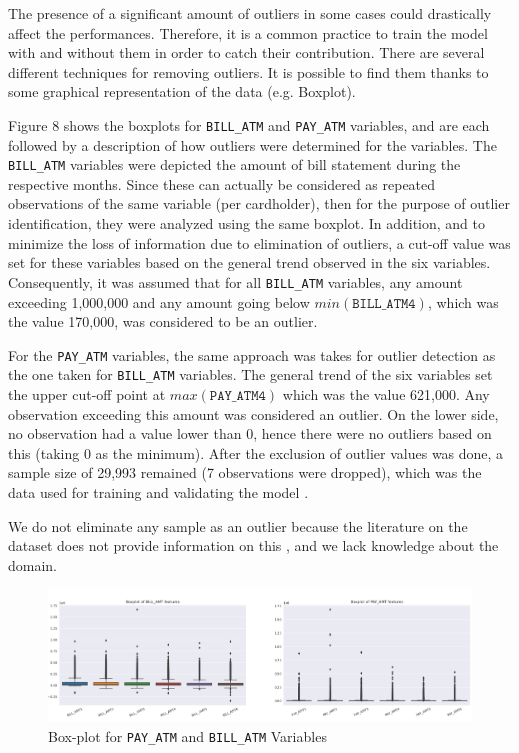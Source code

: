 \documentclass{article}
\begin{document}
The presence of a significant amount of outliers in some cases could drastically affect the performances. Therefore, it is a common practice to train the model with and without them in order to catch their contribution. 
There are several different techniques for removing outliers. It is possible to find them thanks to some graphical representation of the data (e.g. Boxplot).

Figure 8 shows the boxplots for \texttt{BILL\_ATM} and  \texttt{PAY\_ATM} variables, and are each followed by a description of how outliers were determined for the variables.
The \texttt{BILL\_ATM} variables were depicted the amount of bill statement during the respective months. Since these can actually be considered as repeated observations of the same variable (per cardholder), then for the purpose of outlier identification, they were analyzed using the same boxplot. In addition, and to minimize the loss of information due to elimination of outliers, a cut-off value was set for these variables based on the general trend observed in the six variables. Consequently, it was assumed that for all \texttt{BILL\_ATM} variables, any amount exceeding 1,000,000 and any amount going below $min(\texttt{BILL\_ATM4})$, which was the value 170,000, was considered to be an outlier.

For the \texttt{PAY\_ATM} variables, the same approach was takes for outlier detection as the one taken for \texttt{BILL\_ATM} variables. The general trend of the six variables set the upper cut-off point at $max(\texttt{PAY\_ATM4})$ which was the value 621,000. Any observation exceeding this amount was considered an outlier. On the lower side, no observation had a value lower than 0, hence there were no outliers based on this (taking 0 as the minimum).
After the exclusion of outlier values was done, a sample size of 29,993 remained (7 observations were dropped), which was the data used for training and validating the model \cite{ventidue}.

We do not eliminate any sample as an outlier because the literature on the dataset does not provide information on this \cite{diciasette}, and we lack knowledge about the domain.

\begin{figure}[h]
\centering
\includegraphics[width=1\textwidth]{outliers.png}
\caption{Box-plot for \texttt{PAY\_ATM} and \texttt{BILL\_ATM} Variables}
\end{figure}
\end{document}
